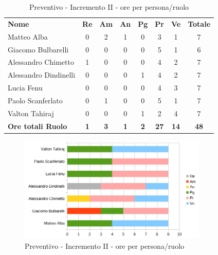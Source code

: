 	\begin{table} [h!]
	\begin{center}
		\begin{tabular} { m{3.5cm} c c c c c c c }
			\rowcolor{lightgray}
			\textbf{Nome} & \textbf{Re} & \textbf{Am} & \textbf{An} & \textbf{Pg} & \textbf{Pr} & \textbf{Ve} & \textbf{Totale} \\
			Matteo Alba & 0 & 2 & 1 & 0 & 3 & 1 & 7 \\
			Giacomo Bulbarelli & 0 & 0 & 0 & 0 & 5 & 1 & 6 \\
			Alessandro Chimetto & 1 & 0 & 0 & 0 & 4 & 2 & 7 \\
			Alessandro Dindinelli & 0 & 0 & 0 & 1 & 4 & 2 & 7 \\
			Lucia Fenu & 0 & 0 & 0 & 0 & 4 & 3 & 7 \\
			Paolo Scanferlato & 0 & 1 & 0 & 0 & 5 & 1 & 7 \\
			Valton Tahiraj & 0 & 0 & 0 & 1 & 2 & 4 & 7 \\
			\textbf{Ore totali Ruolo} & \textbf{1} & \textbf{3} & \textbf{1} & \textbf{2} & \textbf{27}& \textbf{14} & \textbf{48}
		\end{tabular}
		\caption{Preventivo - Incremento II - ore per persona/ruolo}
	\end{center}
\end{table}
\begin{figure} [h!]
	\centering
	\includegraphics[width=0.8\textwidth]{res/img/preventivi/3-barre.png}
	\caption{Preventivo - Incremento II - ore per persona/ruolo} 
\end{figure}

\newpage

